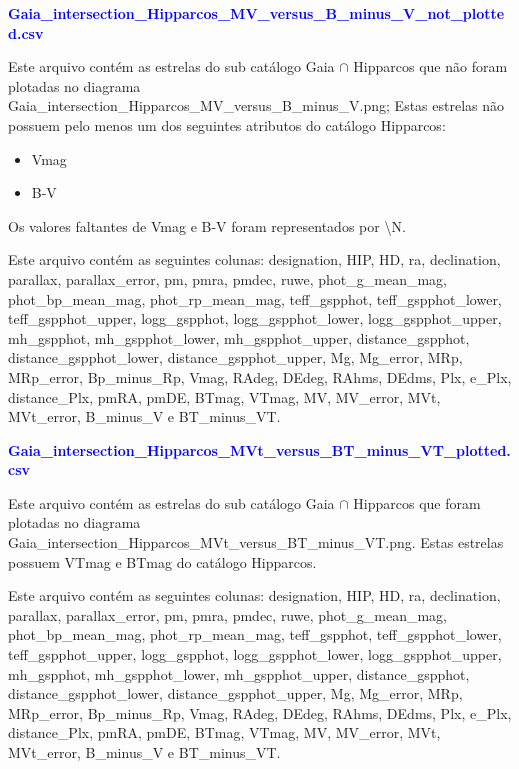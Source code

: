 \documentclass{article}
\begin{document}
	\vspace{10pt}

	\textcolor{blue}{\textbf{Gaia\_intersection\_Hipparcos\_MV\_versus\_B\_minus\_V\_not\_plotted.csv}}
		
	\vspace{10pt}
	
	Este arquivo contém as estrelas do sub catálogo Gaia $\cap$ Hipparcos que não foram plotadas no diagrama Gaia\_intersection\_Hipparcos\_MV\_versus\_B\_minus\_V.png; 
	Estas estrelas não possuem pelo menos um dos seguintes atributos do catálogo Hipparcos: 
	
	\begin{itemize}
		\item Vmag
		\item B-V
	\end{itemize}

	Os valores faltantes de Vmag e B-V foram representados por \textbackslash N.
	
	Este arquivo contém as seguintes colunas:
	designation, HIP, HD, ra, declination, parallax, parallax\_error, pm, pmra, pmdec, ruwe, phot\_g\_mean\_mag, phot\_bp\_mean\_mag, phot\_rp\_mean\_mag, teff\_gspphot, teff\_gspphot\_lower, teff\_gspphot\_upper, logg\_gspphot, logg\_gspphot\_lower, logg\_gspphot\_upper, mh\_gspphot, mh\_gspphot\_lower, mh\_gspphot\_upper, distance\_gspphot, distance\_gspphot\_lower, distance\_gspphot\_upper, Mg, Mg\_error, MRp, MRp\_error, Bp\_minus\_Rp, Vmag, RAdeg, DEdeg, RAhms, DEdms, Plx, e\_Plx, distance\_Plx, pmRA, pmDE, BTmag, VTmag, MV, MV\_error, MVt, MVt\_error, B\_minus\_V e BT\_minus\_VT.
	
	\vspace{10pt}

	\textcolor{blue}{\textbf{Gaia\_intersection\_Hipparcos\_MVt\_versus\_BT\_minus\_VT\_plotted.csv}}
		
	\vspace{10pt}
	
	Este arquivo contém as estrelas do sub catálogo Gaia $\cap$ Hipparcos que foram plotadas no diagrama Gaia\_intersection\_Hipparcos\_MVt\_versus\_BT\_minus\_VT.png. 
	Estas estrelas possuem VTmag e BTmag do catálogo Hipparcos.
	
	Este arquivo contém as seguintes colunas:
	designation, HIP, HD, ra, declination, parallax, parallax\_error, pm, pmra, pmdec, ruwe, phot\_g\_mean\_mag, phot\_bp\_mean\_mag, phot\_rp\_mean\_mag, teff\_gspphot, teff\_gspphot\_lower, teff\_gspphot\_upper, logg\_gspphot, logg\_gspphot\_lower, logg\_gspphot\_upper, mh\_gspphot, mh\_gspphot\_lower, mh\_gspphot\_upper, distance\_gspphot, distance\_gspphot\_lower, distance\_gspphot\_upper, Mg, Mg\_error, MRp, MRp\_error, Bp\_minus\_Rp, Vmag, RAdeg, DEdeg, RAhms, DEdms, Plx, e\_Plx, distance\_Plx, pmRA, pmDE, BTmag, VTmag, MV, MV\_error, MVt, MVt\_error, B\_minus\_V e BT\_minus\_VT.
	
\end{document}
